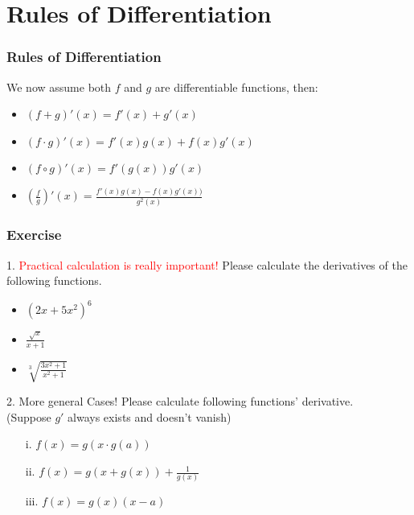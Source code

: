 \documentclass{beamer}
\begin{document}
\section{Rules of Differentiation}
\begin{frame}
    \frametitle{Rules of Differentiation}
    We now assume both $f$ and $g$ are differentiable functions, then:
    \begin{itemize}
        \item $(f+g)'(x)=f'(x)+g'(x)$
              \vspace{1em}
        \item $(f\cdot g)'(x)=f'(x)g(x)+f(x)g'(x)$
              \vspace{1em}
        \item $(f\circ g)'(x)=f'(g(x))g'(x)$
              \vspace{1em}
        \item $(\frac{f}{g})'(x)=\frac{f'(x)g(x)-f(x)g'(x))}{g^2(x)}$
              \vspace{1em}
    \end{itemize}
\end{frame}
\begin{frame}
    \frametitle{Exercise}
    1. \textcolor{red}{Practical calculation is really important!}
    Please calculate the derivatives of the following functions.
    \begin{itemize}
        \item $(2x+5x^2)^6$
              \vspace{0.3em}
        \item $\frac{\sqrt{x}}{x+1}$
              \vspace{0.3em}
        \item $\sqrt[3]{\frac{3x^2+1}{x^2+1}}$
    \end{itemize}
\end{frame}
\begin{frame}
    2. More general Cases! Please calculate following functions' derivative.\\(Suppose $g'$ always exists and doesn't vanish)
    \begin{enumerate}
        \item[i.]   $f(x)=g(x\cdot g(a))$
        \item[ii.]  $f(x)=g(x+g(x))+\frac{1}{g(x)}$
        \item[iii.] $f(x) =g(x)(x-a)$
    \end{enumerate}

\end{frame}
\end{document}
